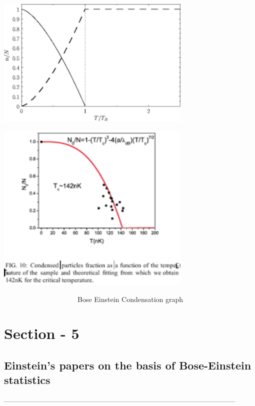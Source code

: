 \documentclass[12pt, letterpaper]{article}
\begin{document}
    \begin{adjustbox}{center,caption={},label={somelabel},nofloat=figure,vspace=\bigskipamount}
        \includegraphics[width=0.7\textwidth]{fig6}
    \end{adjustbox}

    \begin{adjustbox}{center,caption={},label={somelabel},nofloat=figure,}
        \includegraphics[width=0.7\textwidth]{fig7}
    \end{adjustbox}
      \ \ \ \ \ \ \ \ \ \ \ \ \ \ \ \ \ \ \ \ \  Bose Einstein Condensation graph
    \newpage
    \section*{Section - 5}
    \subsection*{Einstein's papers on the basis of Bose-Einstein statistics}
    \noindent
    --------------------------------------------------------------------------------------------------- \\ 
    \\
    \\
    \\
\end{document}
